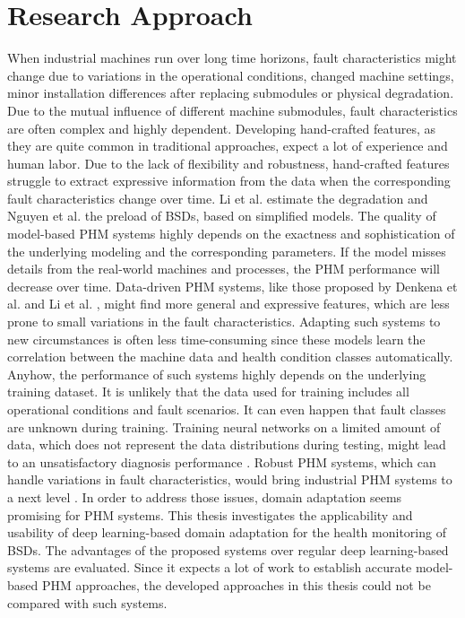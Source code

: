 \chapter{Research Approach}\label{chapter:research_approach}

When industrial machines run over long time horizons, fault characteristics might change due to variations in the operational conditions, changed machine settings, minor installation differences after replacing submodules or physical degradation. Due to the mutual influence of different machine submodules, fault characteristics are often complex and highly dependent. Developing hand-crafted features, as they are quite common in traditional approaches, expect a lot of experience and human labor. Due to the lack of flexibility and robustness, hand-crafted features struggle to extract expressive information from the data when the corresponding fault characteristics change over time. Li et al. \cite{Lee2015} estimate the degradation and Nguyen et al. \cite{NGUYEN2019} the preload of BSDs, based on simplified models. The quality of model-based PHM systems highly depends on the exactness and sophistication of the underlying modeling and the corresponding parameters. If the model misses details from the real-world machines and processes, the PHM performance will decrease over time. Data-driven PHM systems, like those proposed by Denkena et al. \cite{Denkena2021} and Li et al. \cite{LiPin2018}, might find more general and expressive features, which are less prone to small variations in the fault characteristics. Adapting such systems to new circumstances is often less time-consuming since these models learn the correlation between the machine data and health condition classes automatically. Anyhow, the performance of such systems highly depends on the underlying training dataset. It is unlikely that the data used for training includes all operational conditions and fault scenarios. It can even happen that fault classes are unknown during training. Training neural networks on a limited amount of data, which does not represent the data distributions during testing, might lead to an unsatisfactory diagnosis performance \cite{AZAMFAR2020103932}. Robust PHM systems, which can handle variations in fault characteristics, would bring industrial PHM systems to a next level \cite{Michau2017}. In order to address those issues, domain adaptation seems promising for PHM systems. This thesis investigates the applicability and usability of deep learning-based domain adaptation for the health monitoring of BSDs. The advantages of the proposed systems over regular deep learning-based systems are evaluated. Since it expects a lot of work to establish accurate model-based PHM approaches, the developed approaches in this thesis could not be compared with such systems.

